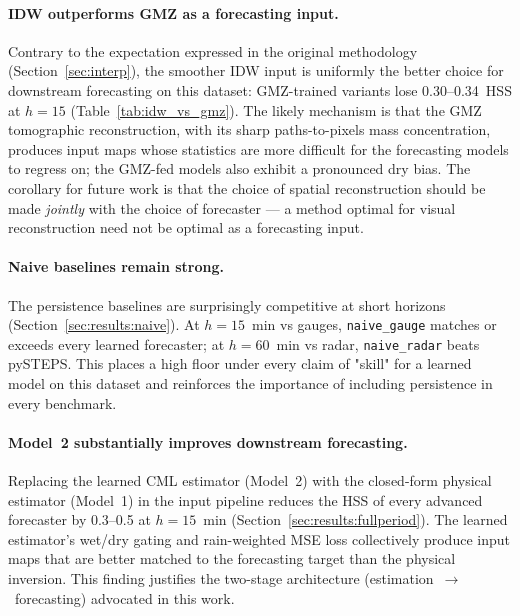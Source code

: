 \documentclass[12pt, a4paper]{article}
\begin{document}
\paragraph{IDW outperforms GMZ as a forecasting input.}
Contrary to the expectation expressed in the original methodology
(Section~\ref{sec:interp}), the smoother IDW input is uniformly the
better choice for downstream forecasting on this dataset:
GMZ-trained variants lose 0.30--0.34~HSS at $h\!=\!15$
(Table~\ref{tab:idw_vs_gmz}). The likely mechanism is that the GMZ
tomographic reconstruction, with its sharp paths-to-pixels mass
concentration, produces input maps whose statistics are more
difficult for the forecasting models to regress on; the GMZ-fed
models also exhibit a pronounced dry bias. The corollary for future
work is that the choice of spatial reconstruction should be made
\emph{jointly} with the choice of forecaster --- a method optimal for
visual reconstruction need not be optimal as a forecasting input.

\paragraph{Naive baselines remain strong.}
The persistence baselines are surprisingly competitive at short
horizons (Section~\ref{sec:results:naive}). At $h\!=\!15$~min vs
gauges, \texttt{naive\_gauge} matches or exceeds every learned
forecaster; at $h\!=\!60$~min vs radar, \texttt{naive\_radar} beats
pySTEPS. This places a high floor under every claim of "skill" for a
learned model on this dataset and reinforces the importance of
including persistence in every benchmark.

\paragraph{Model~2 substantially improves downstream forecasting.}
Replacing the learned CML estimator (Model~2) with the closed-form
physical estimator (Model~1) in the input pipeline reduces the HSS of
every advanced forecaster by 0.3--0.5 at $h\!=\!15$~min
(Section~\ref{sec:results:fullperiod}). The learned estimator's
wet/dry gating and rain-weighted MSE loss collectively produce input
maps that are better matched to the forecasting target than the
physical inversion. This finding justifies the two-stage architecture
(estimation~$\to$~forecasting) advocated in this work.
\end{document}
